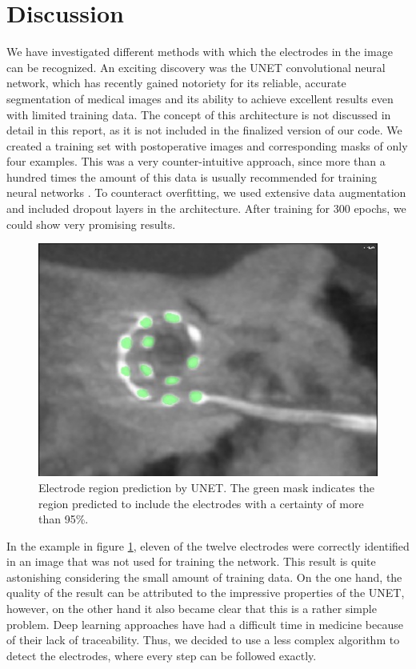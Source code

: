 \documentclass[a4paper, 11pt]{article}
\begin{document}
\section{Discussion}
We have investigated different methods with which the electrodes in the image can be recognized. An exciting discovery was the UNET convolutional neural network, which has recently gained notoriety for its reliable, accurate segmentation of medical images and its ability to achieve excellent results even with limited training data. The concept of this architecture is not discussed in detail in this report, as it is not included in the finalized version of our code. We created a training set with postoperative images and corresponding masks of only four examples. This was a very counter-intuitive approach, since more than a hundred times the amount of this data is usually recommended for training neural networks \cite{hestness_deep_2017, foody_effect_1995}. To counteract overfitting, we used extensive data augmentation and included dropout layers in the architecture. After training for 300 epochs, we could show very promising results.

\begin{figure}[ht]
	\centering
  \includegraphics[width=.5\textwidth]{UNET.jpg}
	\caption{Electrode region prediction by UNET. The green mask indicates the region predicted to include the electrodes with a certainty of more than 95\%.}
	\label{UNET}
\end{figure}

In the example in figure \ref{UNET}, eleven of the twelve electrodes were correctly identified in an image that was not used for training the network. This result is quite astonishing considering the small amount of training data. On the one hand, the quality of the result can be attributed to the impressive properties of the UNET, however, on the other hand it also became clear that this is a rather simple problem. Deep learning approaches have had a difficult time in medicine because of their lack of traceability. Thus, we decided to use a less complex algorithm to detect the electrodes, where every step can be followed exactly. 
\end{document}
